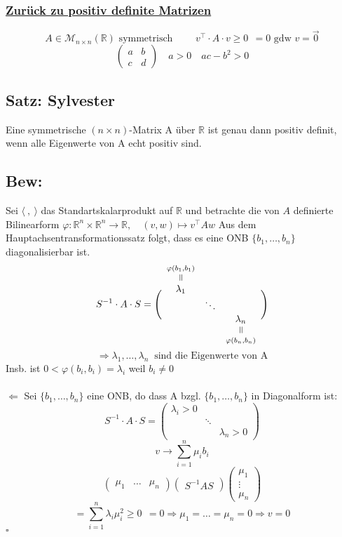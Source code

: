 \documentclass[titlepage,12pt,a4paper,ngerman]{report}
\newenvironment{bew}[1]{\subsection{Bew: #1}}{\hfill$\square$}
\newcommand{\Bew}[2]{\begin{bew}{#1}#2\end{bew}}
\newcommand{\verteq}{\rotatebox{90}{$\,=$}}
\newcommand{\equalto}[2]{\underset{\scriptstyle\overset{\mkern4mu\verteq}{#2}}{#1}}
\newcommand{\equaltoup}[2]{\overset{\scriptstyle\underset{\mkern4mu\verteq}{#2}}{#1}}
\newcommand{\tx}[1]{\textrm{#1}}
\newcommand{\basis}[3]{\{#1_{#2}, \dots, #1_{#3}\}}
\newcommand{\ska}[2]{\langle #1 , #2 \rangle}
\begin{document}
\subsubsection*{\underline{Zurück zu positiv definite Matrizen}}

$$ A \in \mathcal{M}_{n \times n}(\mathbb{R}) \tx{ symmetrisch }\qquad v^\top \cdot A \cdot v \ge 0 \ \ = 0 \tx{ gdw } v = \vec{0} $$
$$\begin{pmatrix}
a & b \\
c & d
\end{pmatrix} \quad a > 0 \quad ac - b^2 > 0$$

\subsection{Satz: Sylvester}
Eine symmetrische $ (n \times n) $-Matrix A über $ \mathbb{R} $ ist genau dann positiv definit, wenn alle Eigenwerte von A echt positiv sind.

\Bew{}{\boxed{\Rightarrow} Sei $\ska{\ }{\ }$ das Standartskalarprodukt auf $\mathbb R$ und betrachte die von $A$ definierte Bilinearform $\varphi: \mathbb R^n \times \mathbb R^n \to \mathbb R, \quad (v,w) \mapsto v^\top A w$ Aus dem Hauptachsentransformationssatz folgt, dass es eine ONB $\basis{b}{1}{n}$ diagonalisierbar ist.
$$ S^{-1} \cdot A \cdot S = \Bigg(
\begin{array}{ccc}
\equaltoup{\lambda_1}{\varphi(b_1,b_1)} \\
& \ddots \\
& & \equalto{\lambda_n}{\varphi(b_n,b_n)}
\end{array} \Bigg)$$ $$\Rightarrow \lambda_1,\dots,\lambda_n \ \tx{ sind die Eigenwerte von A}$$
Insb. ist $ 0 < \varphi(b_i,b_i) = \lambda_i $ weil $ b_i \neq 0 $\\\\

\noindent $ \boxed{\Leftarrow} $
Sei $ \basis{b}{1}{n} $ eine ONB, do dass A bzgl. $ \basis{b}{1}{n} $ in Diagonalform ist:
$$S^{-1} \cdot A \cdot S = \begin{pmatrix}
\lambda_i > 0\\
& \ddots \\
& & \lambda_n >0
\end{pmatrix}$$
$$v \rightarrow \sum_{i=1}^{n} \mu_i b_i$$
$$\begin{pmatrix}
\mu_1 & \dots & \mu_n
\end{pmatrix} \begin{pmatrix}
S^{-1} A S
\end{pmatrix} \begin{pmatrix}
\mu_1\\
\vdots\\
\mu_n
\end{pmatrix}$$ $$= \sum_{i=1}^{n} \lambda_i \mu_i^2 \ge 0  \ \ = 0 \Rightarrow \mu_1 = \dots = \mu_n = 0 \Rightarrow v = 0$$
}
\end{document}
